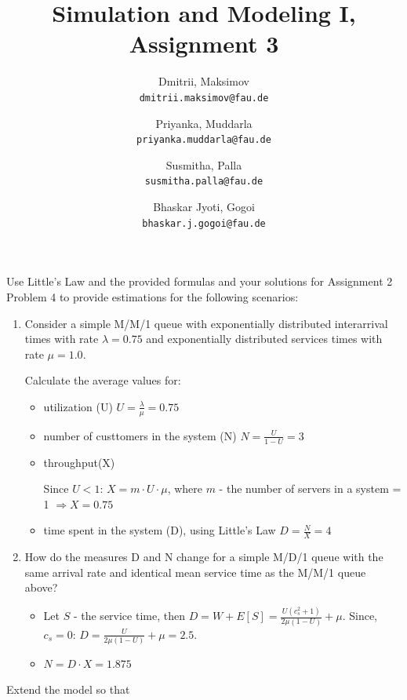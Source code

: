 \documentclass{homework}
\title{Simulation and Modeling I, Assignment 3}
\author{
  Dmitrii, Maksimov\\
  \texttt{dmitrii.maksimov@fau.de}
  \and
  Priyanka, Muddarla\\
  \texttt{priyanka.muddarla@fau.de}
  \and
  Susmitha, Palla\\
  \texttt{susmitha.palla@fau.de}
  \and
  Bhaskar Jyoti, Gogoi\\
  \texttt{bhaskar.j.gogoi@fau.de}
}
\begin{document}
\maketitle

\exercise
Use Little’s Law and the provided formulas and your solutions for Assignment 2 Problem 4 to provide estimations for the following scenarios:
\begin{enumerate}[label=(\alph*)]
	\item Consider a simple M/M/1 queue with exponentially distributed interarrival times with rate $\lambda=0.75$ and exponentially distributed services times with rate $\mu=1.0$.

Calculate the average values for:
\begin{itemize}
	\item utilization (U) $U = \frac{\lambda}{\mu}=0.75$
	\item number of custtomers in the system (N) $N = \frac{U}{1 - U} = 3$
	\item throughput(X)

	Since $U < 1$: $X = m\cdot U\cdot \mu$, where $m$ - the number of servers in a system = 1 $\Rightarrow X=0.75$
	\item time spent in the system (D), using Little's Law $D = \frac{N}{X} = 4$
\end{itemize}
	\item How do the measures D and N change for a simple M/D/1 queue with the same arrival rate and identical mean service time as the M/M/1 queue above? 
	
	\begin{itemize}
	\item Let $S$ - the service time, then $D = W + E[S] = \frac{U(c_s^2 + 1)}{2\mu(1-U)} + {\mu}$. \newline Since, $c_s = 0$: $D = \frac{U}{2\mu(1-U)} + \mu =  2.5$.
	\item $N=D\cdot X=1.875$
	\end{itemize}
	
\end{enumerate}
\exercise Extend the model so that
\end{document}
